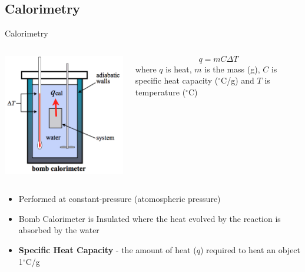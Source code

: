 \documentclass[11pt]{beamer}
\begin{document}
\subsection{Calorimetry}

\begin{frame}{Calorimetry}
  \begin{columns}
    \begin{center}
      \includegraphics[scale=0.3]{bomb_calor}
    \end{center}
    \begin{equation}
      q = mC\Delta T
    \end{equation}
    where $q$ is heat, $m$ is the mass (g), $C$ is
    specific heat capacity ($^\circ$C/g) and $T$ is
    temperature ($^\circ$C)
  \end{columns}
  
  \begin{itemize}
  \item Performed at constant-pressure (atomospheric pressure)
  \item Bomb Calorimeter is Insulated where the heat evolved by the reaction
    is absorbed by the water
  \item \textbf{Specific Heat Capacity} - the amount of heat ($q$)
    required to heat an object 1$^\circ$C/g
  \end{itemize}
\end{frame}
\end{document}
